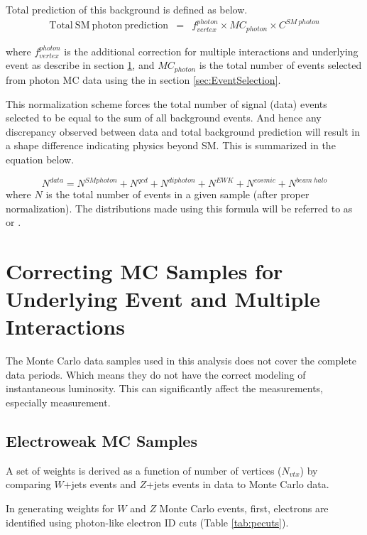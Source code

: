 \documentclass[11pt]{article}
\begin{document}
Total prediction of this background is defined as below.
\begin{eqnarray}
\mathrm{Total~SM~photon~prediction} &=& f_{vertex}^{photon}\times MC_{photon} \times C^{SM~photon}
\label{eqa:PhoFinal}
\end{eqnarray}

\noindent where $f_{vertex}^{photon}$ is the additional correction for multiple interactions and underlying event as describe in section \ref{sec:MCcorrectionsUEMI}, and $MC_{photon}$ is the total number of events selected from photon MC data using the  in section \ref{sec:EventSelection}.

This normalization scheme forces the total number of signal (data) events selected to be equal to the sum of all background events. And hence any discrepancy observed between data and total background prediction will result in a shape difference indicating physics beyond SM. This is summarized in the equation below.

\begin{equation}
 N^{data} = N^{SM photon}+N^{qcd}+N^{diphoton}+ N^{EWK}+N^{cosmic}+N^{beam~halo}
\end{equation}
\noindent where $N$ is the total number of events in a given sample (after proper normalization). The distributions made using this formula will be referred to as  or .


\section{Correcting MC Samples for Underlying Event and Multiple Interactions}\label{sec:MCcorrectionsUEMI}
The Monte Carlo data samples used in this analysis does not cover the complete data periods. Which means they do not have the correct modeling of instantaneous luminosity. This can significantly affect the measurements, especially \met measurement.

\subsection{Electroweak MC Samples}\label{sec:ewkMCcorrections}
A set of weights is derived as a function of number of vertices ($N_{vtx}$) by comparing $W$+jets events and $Z$+jets events in data to Monte Carlo data.

In generating weights for $W$ and $Z$ Monte Carlo events, first, electrons are identified using photon-like electron ID cuts (Table \ref{tab:pecuts}).
\end{document}

